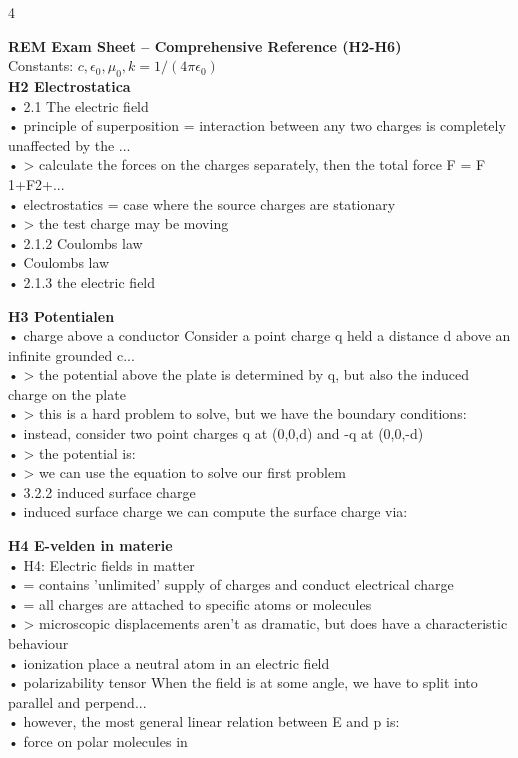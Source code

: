 \documentclass[8pt,a4paper]{article}
\begin{document}
\tiny

\begin{multicols*}{4}

\textbf{\footnotesize REM Exam Sheet -- Comprehensive Reference (H2-H6)}\\
{\tiny Constants: $c,\epsilon_0,\mu_0,k=1/(4\pi\epsilon_0)$}\\[2pt]


\textbf{H2 Electrostatica}\\
• 2.1 The electric field\\
• principle of superposition = interaction between any two charges is completely unaffected by the ...\\
• > calculate the forces on the charges separately, then the total force F = F 1+F2+...\\
• electrostatics = case where the source charges are stationary\\
• > the test charge may be moving\\
• 2.1.2 Coulombs law\\
• Coulombs law\\
• 2.1.3 the electric field\\
\columnbreak

\textbf{H3 Potentialen}\\
• charge above a conductor Consider a point charge q held a distance d above an infinite grounded c...\\
• > the potential above the plate is determined by q, but also the induced charge on the plate\\
• > this is a hard problem to solve, but we have the boundary conditions:\\
• instead, consider two point charges q at (0,0,d) and -q at (0,0,-d)\\
• > the potential is:\\
• > we can use the equation to solve our first problem\\
• 3.2.2 induced surface charge\\
• induced surface charge we can compute the surface charge via:\\
\columnbreak

\textbf{H4 E-velden in materie}\\
• H4: Electric fields in matter\\
• = contains 'unlimited' supply of charges and conduct electrical charge\\
• = all charges are attached to specific atoms or molecules\\
• > microscopic displacements aren't as dramatic, but does have a characteristic behaviour\\
• ionization place a neutral atom in an electric field\\
• polarizability tensor When the field is at some angle, we have to split into parallel and perpend...\\
• however, the most general linear relation between E and p is:\\
• force on polar molecules in\\
\columnbreak


\end{multicols*}
\end{document}
